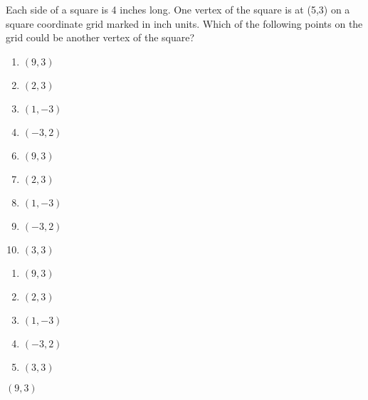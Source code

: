 Each side of a square is 4 inches long. One vertex of the square is at (5,3) on a square coordinate grid marked in inch units. Which of the following points on the grid could be another vertex of the square?

\ifsat
	\begin{enumerate}[label=\Alph*)]
		\item   $(9,3)$ %
		\item  $(2,3)$ 
		\item  $(1,-3)$ 
		\item  $(-3,2)$ 
	\end{enumerate}
\else
\fi

\ifacteven
	\begin{enumerate}[label=\textbf{\Alph*.},itemsep=\fill,align=left]
		\setcounter{enumii}{5}
		\item   $(9,3)$ %
		\item  $(2,3)$ 
		\item  $(1,-3)$ 
		\addtocounter{enumii}{1}
		\item  $(-3,2)$ 
		\item  $(3,3)$ 
	\end{enumerate}
\else
\fi

\ifactodd
	\begin{enumerate}[label=\textbf{\Alph*.},itemsep=\fill,align=left]
		\item   $(9,3)$ %
		\item  $(2,3)$ 
		\item  $(1,-3)$ 
		\item  $(-3,2)$ 
		\item  $(3,3)$ 
	\end{enumerate}
\else
\fi

\ifgridin
   $(9,3)$ %
		
\else
\fi

